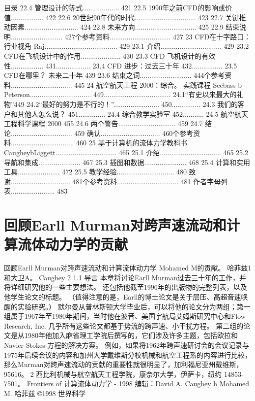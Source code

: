 \documentclass[UTF8,11pt,a4paper,openany,fontset=fandol]{ctexbook}
\begin{document}
目录 22.4 管理设计的等式................... 421 22.5 1990年之前CFD的影响或价值................. 422 22.6 20世纪90年代的时代................................ 423 22.7 关键推动因素............................ 424 22.8 未来方向................................ 425 22.9 结束说明........................... 427个参考资料................................ 427 23 CFD在十字路口：行业视角 Raj...................................... 429 23.1 介绍................................ 429 23.2 CFD在飞机设计中的作用..................... 430 23.3 CFD 飞机设计的有效性................. 431.................. 23.4 CFD 进步：过去三十年 432................ 23.5 CFD在哪里？ 未来二十年 439 23.6 结束之词........................... 444个参考资料................................ 445 24 航空航天工程 2000：综合。 实践课程 Seebass b Peterson................................ 449................................... 24.1“有史以来最大的礼物”449 24.2“最好的努力是不行的！”........................ 450............... 24.3 我们的客户和其他人怎么说？ 451.............. 24.4 综合教学实验室 452........... 24.5 航空航天工程科学课程 2000 455 24.6 两个警告.............................. 459 24.7 结论................................ 459 确认............................... 460个参考资料................................. 460 25 基于计算机的流体力学教科书 CaugheybLiggett................................ 465 25.1 介绍................................ 465 25.2 导航和集成...................... 467 25.3 插图和数据...................... 468 25.4 计算和实用工具...................... 472 25.5 教学经验.............................. 480 致谢............................... 481个参考资料................................ 481 作者字母列表....................... 483

\clearpage
\chapter{回顾Earll Murman对跨声速流动和计算流体动力学的贡献}
回顾Earll Murman对跨声速流动和计算流体动力学 Mohamed M的贡献。 哈菲兹1和大卫A。 Caughey 2 1.1 导言 本章将讨论Earll Murman过去三十年的工作，并将详细研究他的一些主要想法。 还包括他截至1996年的出版物的完整列表，以及他学生论文的标题。 （值得注意的是，Earll的博士论文是关于层压、高超音速唤醒的实验研究。） 默尔曼从普林斯顿大学毕业后，可以将他的论文分为两组；第一组属于1967年至1980年期间，当时他在波音、美国宇航局艾姆斯研究中心和Flow Research, Inc. 几乎所有这些论文都基于势流的跨声速、小干扰方程。 第二组的论文是从1980年他加入麻省理工学院后撰写的，它们涉及许多主题，包括欧拉和Navier-Stokes 方程的解决方案。 例如，如果将1962年跨声速研讨会的会议记录与1975年后续会议的内容和加州大学戴维斯分校机械和航空工程系的内容进行比较，那么Murman对跨声速流动的贡献的重要性就很明显了，加利福尼亚州戴维斯，95616。 2 西比利机械与航空航天工程学院，康奈尔大学，伊萨卡，纽约 14853-7501。 Frontiers of 计算流体动力学 - 1998 编辑：David A. Caughey h Mohamed M. 哈菲兹 ©1998 世界科学
\end{document}

